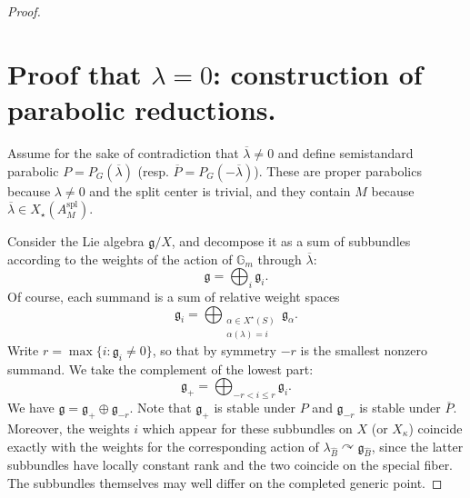\documentclass[openany]{amsbook}
\theoremstyle{definition}
\theoremstyle{remark}
\numberwithin{equation}{section}
\newcommand{\G}{\mathbb{G}}
\newcommand{\ol}[1]{\overline{#1}}
\renewcommand{\-}{\operatorname{-}}
\renewcommand{\fg}{\mathfrak{g}}
\newcommand{\spl}{\mathrm{spl}}
\begin{document}
\begin{proof}
\section{\texorpdfstring{Proof that $\lambda = 0$: construction of parabolic reductions.}{Proof that lambda = 0: construction of parabolic reductions.}} 



Assume for the sake of contradiction that $\ol{\lambda} \neq 0$ and define semistandard parabolic $P = P_G(\ol{\lambda})$ (resp. $\ol{P} = P_G(-\ol{\lambda})$). These are proper parabolics because $\lambda \neq 0$ and the split center is trivial, and they contain $M$ because $\ol{\lambda} \in X_\star(A_M^{\spl})$.

Consider the Lie algebra $\fg/X$, and decompose it as a sum of subbundles according to the weights of the action of $\G_m$ through $\ol{\lambda}$: 
\[
    \fg = \bigoplus_{i} \fg_i.
\]
Of course, each summand is a sum of relative weight spaces
\[
    \fg_i = \bigoplus_{\substack{\alpha \in X^\star(S) \\ \alpha(\lambda) = i}} \fg_{\alpha}.
\]
Write $r = \max\{i : \fg_i \neq 0\}$, so that by symmetry $-r$ is the smallest nonzero summand. We take the complement of the lowest part:
\[
    \fg_+ = \bigoplus_{-r < i \le r} \fg_i.
\]
We have $\fg = \fg_+ \oplus \fg_{-r}$. Note that $\fg_+$ is stable under $P$ and $\fg_{-r}$ is stable under $\ol{P}$. Moreover, the weights $i$ which appear for these subbundles on $X$ (or $X_{\kappa}$) coincide exactly with the weights for the corresponding action of $\lambda_{\widehat{B}} \curvearrowright \fg_{\widehat{B}}$, since the latter subbundles have locally constant rank and the two coincide on the special fiber. The subbundles themselves may well differ on the completed generic point.


\end{proof}
\end{document}

